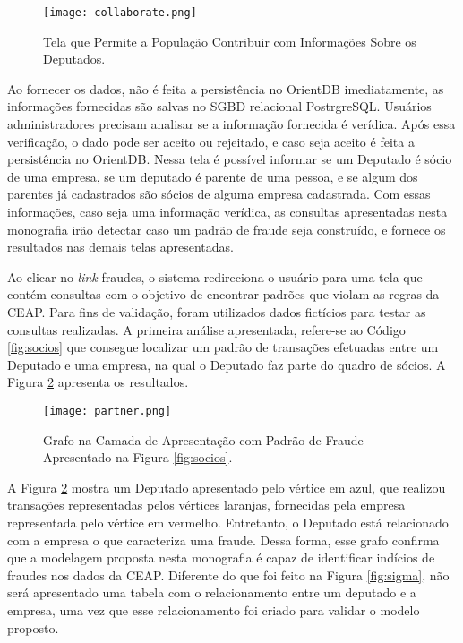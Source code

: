 \begin{figure}[H]
\centering
\texttt{[image: collaborate.png]}
\caption{Tela que Permite a População Contribuir com Informações Sobre os Deputados.}
\label{fig:collaborate}
\end{figure}

Ao fornecer os dados, não é feita a persistência no OrientDB imediatamente, as informações fornecidas são salvas no SGBD relacional PostrgreSQL. Usuários administradores precisam analisar se a informação fornecida é verídica. Após essa verificação, o dado pode ser aceito ou rejeitado, e caso seja aceito é feita a persistência no OrientDB. Nessa tela é possível informar se um Deputado é sócio de uma empresa, se um deputado é parente de uma pessoa, e se algum dos parentes já cadastrados são sócios de alguma empresa cadastrada. Com essas informações, caso seja uma informação verídica, as consultas apresentadas nesta monografia irão detectar caso um padrão de fraude seja construído, e fornece os resultados nas demais telas apresentadas.

Ao clicar no \textit{link} fraudes, o sistema redireciona o usuário para uma tela que contém consultas com o objetivo de encontrar padrões que violam as regras da CEAP. Para fins de validação, foram utilizados dados fictícios para testar as consultas realizadas. A primeira análise apresentada, refere-se ao Código \ref{fig:socios} que consegue localizar um padrão de transações efetuadas entre um Deputado e uma empresa, na qual o Deputado faz parte do quadro de sócios. A Figura \ref{fig:partner} apresenta os resultados.

\begin{figure}[H]
\centering
\texttt{[image: partner.png]}
\caption{Grafo na Camada de Apresentação com Padrão de Fraude Apresentado na Figura \ref{fig:socios}.}
\label{fig:partner}
\end{figure}

A Figura \ref{fig:partner} mostra um Deputado apresentado pelo vértice em azul, que realizou transações representadas pelos vértices laranjas, fornecidas pela empresa representada pelo vértice em vermelho. Entretanto, o Deputado está relacionado com a empresa o que caracteriza uma fraude. Dessa forma, esse grafo confirma que a modelagem proposta nesta monografia é capaz de identificar indícios de fraudes nos dados da CEAP. Diferente do que foi feito na Figura \ref{fig:sigma}, não será apresentado uma tabela com o relacionamento entre um deputado e a empresa, uma vez que esse relacionamento foi criado para validar o modelo proposto.

